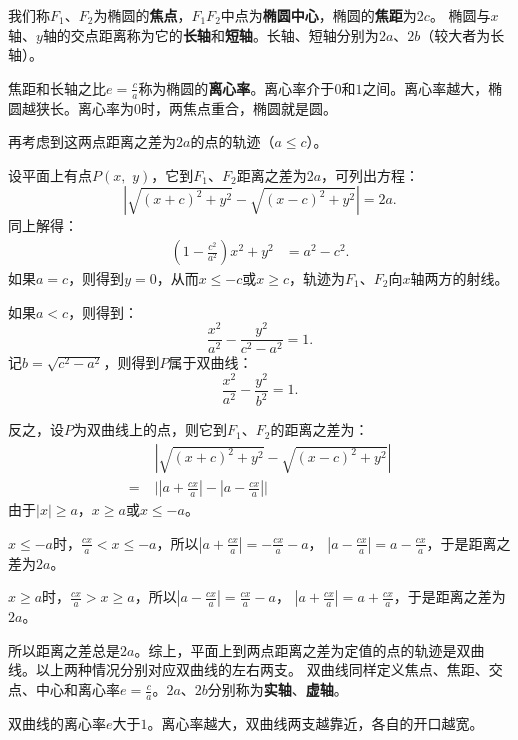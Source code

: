 \documentclass[12pt,UTF8,fontset=none]{ctexbook}
\begin{document}
我们称$F_1$、$F_2$为椭圆的\textbf{焦点}，$F_1F_2$中点为\textbf{椭圆中心}，椭圆的\textbf{焦距}为$2c$。
椭圆与$x$轴、$y$轴的交点距离称为它的\textbf{长轴}和\textbf{短轴}。长轴、短轴分别为$2a$、$2b$（较大者为长轴）。

焦距和长轴之比$\displaystyle e =\frac{c}{a}$称为椭圆的\textbf{离心率}。离心率介于$0$和$1$之间。离心率越大，椭圆越狭长。离心率为$0$时，两焦点重合，椭圆就是圆。

再考虑到这两点距离之差为$2a$的点的轨迹（$a\leqslant c$）。

设平面上有点$P(x, \,\,y)$，它到$F_1$、$F_2$距离之差为$2a$，可列出方程：
$$ \left|\sqrt{(x + c)^2 + y^2} - \sqrt{(x - c)^2 + y^2}\right| = 2a.$$
同上解得：
\begin{align*}
    \left(1 - \frac{c^2}{a^2}\right)x^2 + y^2 &= a^2 - c^2.
\end{align*}
如果$a = c$，则得到$y = 0$，从而$x \leqslant -c$或$x \geqslant c$，轨迹为$F_1$、$F_2$向$x$轴两方的射线。

如果$a < c$，则得到：
$$ \frac{x^2}{a^2} - \frac{y^2}{c^2 - a^2} = 1.$$
记$b = \sqrt{c^2 - a^2}$，则得到$P$属于双曲线：
$$ \frac{x^2}{a^2} - \frac{y^2}{b^2} = 1.$$

反之，设$P$为双曲线上的点，则它到$F_1$、$F_2$的距离之差为：
\begin{align*}
    &\;\left|\sqrt{(x + c)^2 + y^2} - \sqrt{(x - c)^2 + y^2}\right|  \\
    =&\; \Bigg|\left|a + \frac{cx}{a}\right| - \left|a - \frac{cx}{a}\right|\Bigg|
\end{align*}
由于$|x| \geqslant a$，$x \geqslant a$或$x \leqslant -a$。

$x \leqslant -a$时，$\frac{cx}{a} < x \leqslant -a$，所以$\left|a + \frac{cx}{a}\right| = -\frac{cx}{a} - a$，
$\left|a - \frac{cx}{a}\right| = a - \frac{cx}{a}$，于是距离之差为$2a$。

$x \geqslant a$时，$\frac{cx}{a} > x \geqslant a$，所以$\left|a - \frac{cx}{a}\right| = \frac{cx}{a} - a$，
$\left|a + \frac{cx}{a}\right| = a + \frac{cx}{a}$，于是距离之差为$2a$。

所以距离之差总是$2a$。综上，平面上到两点距离之差为定值的点的轨迹是双曲线。以上两种情况分别对应双曲线的左右两支。
双曲线同样定义焦点、焦距、交点、中心和离心率$\displaystyle e =\frac{c}{a}$。$2a$、$2b$分别称为\textbf{实轴}、\textbf{虚轴}。

双曲线的离心率$e$大于$1$。离心率越大，双曲线两支越靠近，各自的开口越宽。
\end{document}
